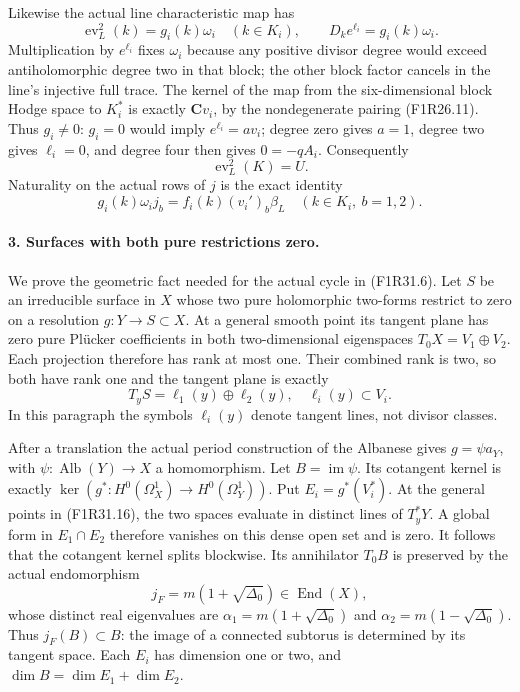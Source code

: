 Likewise the actual line characteristic map
has
\[
 \operatorname{ev}_L^2(k)=g_i(k)\omega_i\quad(k\in K_i),
          \qquad D_k e^{\ell_i}=g_i(k)\omega_i.
 \tag{F1R31.13}
\]
Multiplication by $e^{\ell_i}$ fixes $\omega_i$
because any positive divisor degree would
exceed antiholomorphic degree two in that
block; the other block factor cancels in
the line's injective full trace. The kernel
of the map from the six-dimensional block
Hodge space to $K_i^*$ is exactly
$\mathbf C v_i$, by the nondegenerate
pairing (F1R26.11). Thus $g_i\ne0$:
$g_i=0$ would imply $e^{\ell_i}=a v_i$;
degree zero gives $a=1$, degree two
gives $\ell_i=0$, and degree four then
gives $0=-qA_i$. Consequently
\[
                         \operatorname{ev}_L^2(K)=U.
 \tag{F1R31.14}
\]
Naturality on the actual rows of $j$ is
the exact identity
\[
     g_i(k)\omega_i j_b
           =f_i(k)(v_i')_b\beta_L
                   \quad(k\in K_i,\ b=1,2).
 \tag{F1R31.15}
\]

\paragraph{3. Surfaces with both pure restrictions zero.}
We prove the geometric fact needed for
the actual cycle in (F1R31.6). Let $S$
be an irreducible surface in $X$ whose
two pure holomorphic two-forms restrict
to zero on a resolution $g:Y\to S\subset X$.
At a general smooth point its tangent
plane has zero pure Pl\"ucker coefficients
in both two-dimensional eigenspaces
$T_0X=V_1\oplus V_2$. Each projection
therefore has rank at most one. Their
combined rank is two, so both have rank
one and the tangent plane is exactly
\[
                        T_yS=\ell_1(y)\oplus\ell_2(y),
                                   \quad\ell_i(y)\subset V_i.
 \tag{F1R31.16}
\]
In this paragraph the symbols $\ell_i(y)$
denote tangent lines, not divisor classes.

After a translation the actual period
construction of the Albanese gives
$g=\psi a_Y$, with
$\psi:\operatorname{Alb}(Y)\to X$ a
homomorphism. Let $B=\operatorname{im}\psi$.
Its cotangent kernel is exactly
$\ker(g^*:H^0(\Omega_X^1)\to H^0(\Omega_Y^1))$.
Put $E_i=g^*(V_i^*)$.
At the general points in (F1R31.16),
the two spaces evaluate in distinct
lines of $T_y^*Y$. A global form in
$E_1\cap E_2$ therefore vanishes on
this dense open set and is zero.
It follows that the cotangent kernel
splits blockwise. Its annihilator
$T_0B$ is preserved by the actual
endomorphism
\[
                  j_F=m(1+\sqrt{\Delta_0})\in\operatorname{End}(X),
 \tag{F1R31.17}
\]
whose distinct real eigenvalues are
$\alpha_1=m(1+\sqrt{\Delta_0})$ and
$\alpha_2=m(1-\sqrt{\Delta_0})$.
Thus $j_F(B)\subset B$: the image of a
connected subtorus is determined by
its tangent space. Each $E_i$ has
dimension one or two, and
$\dim B=\dim E_1+\dim E_2$.

